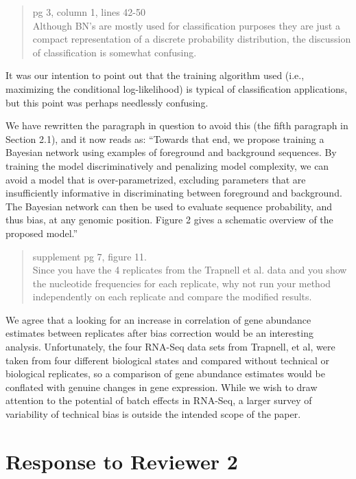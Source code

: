 \documentclass{article}
\begin{document}
\begin{quote}
pg 3, column 1, lines 42-50 \\
Although BN's are mostly used for classification purposes they are just a
compact representation of a discrete probability distribution, the discussion
of classification is somewhat confusing.
\end{quote}

It was our intention to point out that the training algorithm used (i.e.,
maximizing the conditional log-likelihood) is typical of classification
applications, but this point was perhaps needlessly confusing.

We have rewritten the paragraph in question to avoid this (the fifth paragraph
in Section 2.1), and it now reads as: ``Towards that end, we propose training a
Bayesian network using examples of foreground and background sequences. By
training the model discriminatively and penalizing model complexity, we can
avoid a model that is over-parametrized, excluding parameters that are
insufficiently informative in discriminating between foreground and background.
The Bayesian network can then be used to evaluate sequence probability, and thus
bias, at any genomic position. Figure 2 gives a schematic
overview of the proposed model.''


\begin{quote}
supplement pg 7, figure 11. \\
Since you have the 4 replicates from the Trapnell et al. data and you show the
nucleotide frequencies for each replicate, why not run your method independently
on each replicate and compare the modified results.
\end{quote}

We agree that a looking for an increase in correlation of gene abundance
estimates between replicates after bias correction would be an interesting
analysis. Unfortunately, the four RNA-Seq data sets from Trapnell, et al, were
taken from four different biological states and compared without technical or
biological replicates, so a comparison of gene abundance estimates would be
conflated with genuine changes in gene expression.  While we wish to draw
attention to the potential of batch effects in RNA-Seq, a larger survey of
variability of technical bias is outside the intended scope of the paper.


\section*{Response to Reviewer 2}
\end{document}
